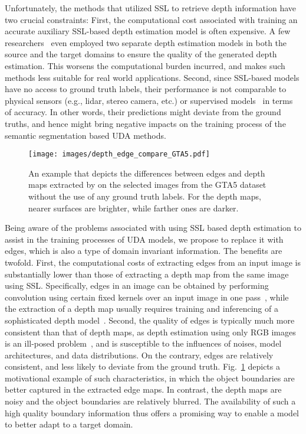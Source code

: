 \documentclass{bmvc2k}
\begin{document}
Unfortunately, the methods that utilized SSL to retrieve depth information have two crucial constraints: First, the computational cost associated with training an accurate auxiliary SSL-based depth estimation model is often expensive. A few researchers~\cite{wang2021domain} even employed two separate depth estimation models in both the source and the target domains to ensure the quality of the generated depth estimation. This worsens the computational burden incurred, and makes such methods less suitable for real world applications. Second, 
since SSL-based models have no access to ground truth labels, their performance is not comparable to physical sensors (e.g., lidar, stereo camera, etc.) or supervised models~\cite{godard2019digging} in terms of accuracy. In other words, their predictions might deviate from the ground truths, and hence might bring negative impacts on the training process of the semantic segmentation based UDA methods.
 


\begin{figure}[t]
  \centering
  \texttt{[image: images/depth\_edge\_compare\_GTA5.pdf]}
  \caption{An example that depicts the differences between edges and depth maps extracted by \cite{godard2019digging} on the selected images from the GTA5 dataset \cite{richter2016playing} without the use of any ground truth labels. For the depth maps, nearer surfaces are brighter, while farther ones are darker.}
  \label{fig:depth_vs_edge_example}
\end{figure}

Being aware of the problems associated with using SSL based depth estimation to assist in the training processes of UDA models, we propose to replace it with edges, which is also a type of domain invariant information. The benefits are twofold. First, the computational costs of extracting edges from an input image is substantially lower than those of extracting a depth map from the same image using SSL. Specifically, edges in an image can be obtained by performing convolution using certain fixed kernels over an input image in one pass~\cite{sobel1998}, while the extraction of a depth map usually requires training and inferencing of a sophisticated depth model~\cite{godard2019digging}. Second, the quality of edges is typically much more consistent than that of depth maps, as depth estimation using only RGB images is an ill-posed problem~\cite{eigen2014depth}, and is susceptible to the influences of noises, model architectures, and data distributions. On the contrary, edges are relatively consistent, and less likely to deviate from the ground truth.
Fig.~\ref{fig:depth_vs_edge_example} depicts a motivational example of such characteristics, in which the object boundaries are better captured in the extracted edge maps. In contrast, the depth maps are noisy and the object boundaries are relatively blurred.
The availability of such a high quality boundary information thus offers a promising way to enable a model to better adapt to a target domain.
\end{document}
